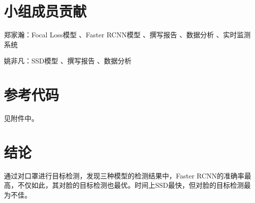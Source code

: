 \documentclass[journal,transmag]{IEEEtran}
\begin{document}
\section{小组成员贡献}
郑家瀚：Focal Loss模型 、Faster RCNN模型 、撰写报告 、数据分析 、实时监测系统

姚非凡：SSD模型 、撰写报告 、数据分析
\section{参考代码}
见附件中。
\section{结论}
通过对口罩进行目标检测，发现三种模型的检测结果中，Faster RCNN的准确率最高，不仅如此，其对脸的目标检测也最优。时间上SSD最快，但对脸的目标检测最为不佳。


%
%



%
%
\end{document}
